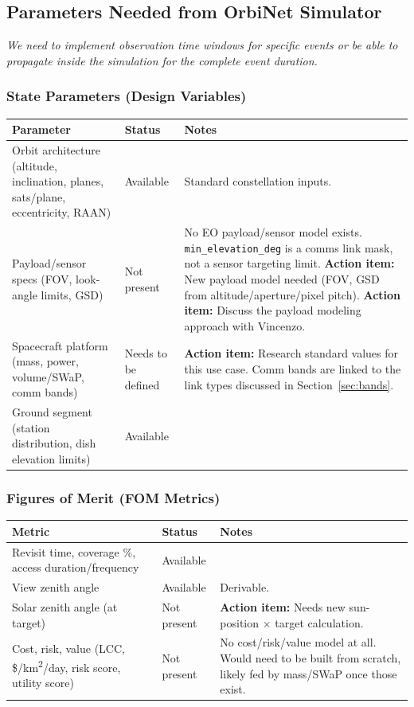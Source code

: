 \documentclass[11pt]{article}
\newcommand{\actionitem}[1]{\textcolor{todo}{\textbf{Action item:}} #1}
\begin{document}
\subsection{Parameters Needed from OrbiNet Simulator}

\textit{We need to implement observation time windows for specific events or be able to propagate inside the simulation for the complete event duration.}

\subsubsection{State Parameters (Design Variables)}

\begin{longtable}{p{4cm}p{2.3cm}p{7.4cm}}
\toprule
\textbf{Parameter} & \textbf{Status} & \textbf{Notes} \\
\midrule
\endhead
Orbit architecture (altitude, inclination, planes, sats/plane, eccentricity, RAAN) & Available & Standard constellation inputs. \\
Payload/sensor specs (FOV, look-angle limits, GSD) & \textcolor{openq}{Not present} & No EO payload/sensor model exists. \texttt{min\_elevation\_deg} is a comms link mask, not a sensor targeting limit. \actionitem{New payload model needed (FOV, GSD from altitude/aperture/pixel pitch).} \actionitem{Discuss the payload modeling approach with Vincenzo.} \\
Spacecraft platform (mass, power, volume/SWaP, comm bands) & \textcolor{openq}{Needs to be defined} & \actionitem{Research standard values for this use case.} Comm bands are linked to the link types discussed in Section~\ref{sec:bands}. \\
Ground segment (station distribution, dish elevation limits) & Available & \\
\bottomrule
\end{longtable}

\subsubsection{Figures of Merit (FOM Metrics)}

\begin{longtable}{p{4cm}p{2.3cm}p{7.4cm}}
\toprule
\textbf{Metric} & \textbf{Status} & \textbf{Notes} \\
\midrule
\endhead
Revisit time, coverage \%, access duration/frequency & Available & \\
View zenith angle & Available & Derivable. \\
Solar zenith angle (at target) & \textcolor{openq}{Not present} & \actionitem{Needs new sun-position $\times$ target calculation.} \\
Cost, risk, value (LCC, \$/km\textsuperscript{2}/day, risk score, utility score) & \textcolor{openq}{Not present} & No cost/risk/value model at all. Would need to be built from scratch, likely fed by mass/SWaP once those exist. \\
\bottomrule
\end{longtable}
\end{document}
